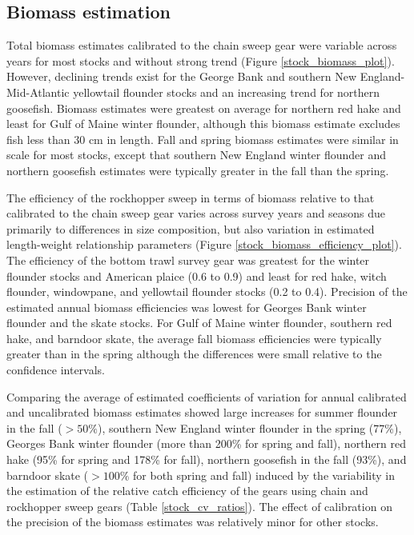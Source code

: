 \documentclass[
  12pt,
]{article}
\begin{document}
\hypertarget{biomass-estimation-1}{%
\subsection{Biomass estimation}\label{biomass-estimation-1}}

Total biomass estimates calibrated to the chain sweep gear were variable
across years for most stocks and without strong trend (Figure
\ref{stock_biomass_plot}). However, declining trends exist for the
George Bank and southern New England-Mid-Atlantic yellowtail flounder
stocks and an increasing trend for northern goosefish. Biomass estimates
were greatest on average for northern red hake and least for Gulf of
Maine winter flounder, although this biomass estimate excludes fish less
than 30 cm in length. Fall and spring biomass estimates were similar in
scale for most stocks, except that southern New England winter flounder
and northern goosefish estimates were typically greater in the fall than
the spring.

The efficiency of the rockhopper sweep in terms of biomass relative to
that calibrated to the chain sweep gear varies across survey years and
seasons due primarily to differences in size composition, but also
variation in estimated length-weight relationship parameters (Figure
\ref{stock_biomass_efficiency_plot}). The efficiency of the bottom trawl
survey gear was greatest for the winter flounder stocks and American
plaice (0.6 to 0.9) and least for red hake, witch flounder, windowpane,
and yellowtail flounder stocks (0.2 to 0.4). Precision of the estimated
annual biomass efficiencies was lowest for Georges Bank winter flounder
and the skate stocks. For Gulf of Maine winter flounder, southern red
hake, and barndoor skate, the average fall biomass efficiencies were
typically greater than in the spring although the differences were small
relative to the confidence intervals.

Comparing the average of estimated coefficients of variation for annual
calibrated and uncalibrated biomass estimates showed large increases for
summer flounder in the fall (\(> 50\%\)), southern New England winter
flounder in the spring (77\%), Georges Bank winter flounder (more than
200\% for spring and fall), northern red hake (95\% for spring and 178\%
for fall), northern goosefish in the fall (93\%), and barndoor skate
(\(>100\%\) for both spring and fall) induced by the variability in the
estimation of the relative catch efficiency of the gears using chain and
rockhopper sweep gears (Table \ref{stock_cv_ratios}). The effect of
calibration on the precision of the biomass estimates was relatively
minor for other stocks.
\end{document}
